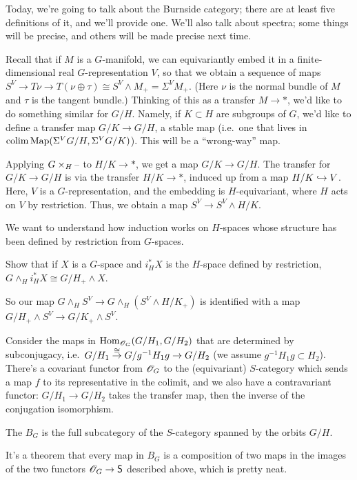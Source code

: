 Today, we're going to talk about the Burnside category; there are at least five definitions of it, and we'll
provide one. We'll also talk about spectra; some things will be precise, and others will be made precise next time.

Recall that if $M$ is a $G$-manifold, we can equivariantly embed it in a finite-dimensional real $G$-representation
$V$, so that we obtain a sequence of maps $S^V\to T\!\nu\to T(\nu\oplus\tau)\cong S^V\wedge M_+ = \Sigma^V M_+$.
(Here $\nu$ is the normal bundle of $M$ and $\tau$ is the tangent bundle.) Thinking of this as a transfer $M\to *$,
we'd like to do something similar for $G/H$. Namely, if $K\subset H$ are subgroups of $G$, we'd like to define a
transfer map $G/K\to G/H$, a stable map (i.e.\ one that lives in $\operatorname*{colim}\operatorname{Map}(\Sigma^V G/H, \Sigma^V G/K)$). This
will be a ``wrong-way'' map.

Applying $G\times_H\text{--}$ to $H/K\to *$, we get a map $G/K\to G/H$. The transfer for $G/K\to G/H$ is via the transfer
$H/K\to *$, induced up from a map $H/K\hookrightarrow V$. Here, $V$ is a $G$-representation, and the embedding is
$H$-equivariant, where $H$ acts on $V$ by restriction. Thus, we obtain a map $S^V\to S^V\wedge H/K$.

We want to understand how induction works on $H$-spaces whose structure has been defined by restriction from
$G$-spaces.
\begin{ex}
Show that if $X$ is a $G$-space and $i_H^*X$ is the $H$-space defined by restriction, $G\wedge_H i_H^*X\cong
G/H_+\wedge X$.
\end{ex}
So our map $G\wedge_H S^V\to G\wedge_H(S^V\wedge H/K_+)$ is identified with a map $G/H_+\wedge S^V\to G/K_+\wedge
S^V$.

Consider the maps in $\operatorname{Hom}_{\mathscr O_G}(G/H_1, G/H_2)$ that are determined by subconjugacy, i.e.\ $G/H_1\stackrel\cong\to
G/g^{-1}H_1g\to G/H_2$ (we assume $g^{-1}H_1g\subset H_2$). There's a covariant functor from $\mathscr O_G$ to the
(equivariant) $S$-category which sends a map $f$ to its representative in the colimit, and we also have a
contravariant functor: $G/H_1\to G/H_2$ takes the transfer map, then the inverse of the conjugation isomorphism.
\begin{defn}
The  $B_G$ is the full subcategory of the $S$-category spanned by the orbits $G/H$.
\end{defn}
It's a theorem that every map in $B_G$ is a composition of two maps in the images of the two functors $\mathscr O_G\to\mathsf
S$ described above, which is pretty neat.

